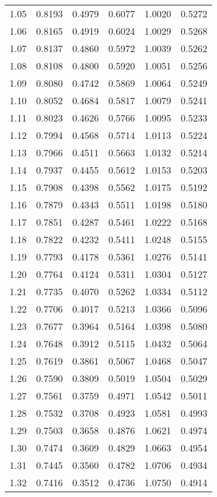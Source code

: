 \documentclass{article}
\begin{document}
\begin{longtable}{cccccc}
1.05 & 0.8193 & 0.4979 & 0.6077 & 1.0020 & 0.5272 \\
1.06 & 0.8165 & 0.4919 & 0.6024 & 1.0029 & 0.5268 \\
1.07 & 0.8137 & 0.4860 & 0.5972 & 1.0039 & 0.5262 \\
1.08 & 0.8108 & 0.4800 & 0.5920 & 1.0051 & 0.5256 \\
1.09 & 0.8080 & 0.4742 & 0.5869 & 1.0064 & 0.5249 \\
1.10 & 0.8052 & 0.4684 & 0.5817 & 1.0079 & 0.5241 \\
1.11 & 0.8023 & 0.4626 & 0.5766 & 1.0095 & 0.5233 \\
1.12 & 0.7994 & 0.4568 & 0.5714 & 1.0113 & 0.5224 \\
1.13 & 0.7966 & 0.4511 & 0.5663 & 1.0132 & 0.5214 \\
1.14 & 0.7937 & 0.4455 & 0.5612 & 1.0153 & 0.5203 \\
1.15 & 0.7908 & 0.4398 & 0.5562 & 1.0175 & 0.5192 \\
1.16 & 0.7879 & 0.4343 & 0.5511 & 1.0198 & 0.5180 \\
1.17 & 0.7851 & 0.4287 & 0.5461 & 1.0222 & 0.5168 \\
1.18 & 0.7822 & 0.4232 & 0.5411 & 1.0248 & 0.5155 \\
1.19 & 0.7793 & 0.4178 & 0.5361 & 1.0276 & 0.5141 \\
1.20 & 0.7764 & 0.4124 & 0.5311 & 1.0304 & 0.5127 \\
1.21 & 0.7735 & 0.4070 & 0.5262 & 1.0334 & 0.5112 \\
1.22 & 0.7706 & 0.4017 & 0.5213 & 1.0366 & 0.5096 \\
1.23 & 0.7677 & 0.3964 & 0.5164 & 1.0398 & 0.5080 \\
1.24 & 0.7648 & 0.3912 & 0.5115 & 1.0432 & 0.5064 \\
1.25 & 0.7619 & 0.3861 & 0.5067 & 1.0468 & 0.5047 \\
1.26 & 0.7590 & 0.3809 & 0.5019 & 1.0504 & 0.5029 \\
1.27 & 0.7561 & 0.3759 & 0.4971 & 1.0542 & 0.5011 \\
1.28 & 0.7532 & 0.3708 & 0.4923 & 1.0581 & 0.4993 \\
1.29 & 0.7503 & 0.3658 & 0.4876 & 1.0621 & 0.4974 \\
1.30 & 0.7474 & 0.3609 & 0.4829 & 1.0663 & 0.4954 \\
1.31 & 0.7445 & 0.3560 & 0.4782 & 1.0706 & 0.4934 \\
1.32 & 0.7416 & 0.3512 & 0.4736 & 1.0750 & 0.4914 \\

\end{longtable}
\end{document}
